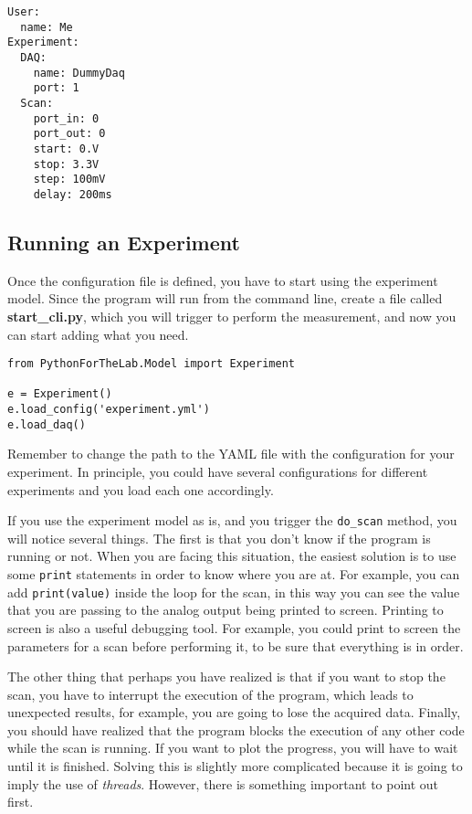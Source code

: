 \begin{verbatim}
User:
  name: Me
Experiment:
  DAQ:
    name: DummyDaq
    port: 1
  Scan:
    port_in: 0
    port_out: 0
    start: 0.V
    stop: 3.3V
    step: 100mV
    delay: 200ms
\end{verbatim}

\subsection{Running an Experiment}\label{running-anexperiment}
Once the configuration file is defined, you have to start using the
experiment model. Since the program will run from the command line,
create a file called \textbf{start\_cli.py}, which you will trigger to
perform the measurement, and now you can start adding what you need.

\begin{verbatim}
from PythonForTheLab.Model import Experiment

e = Experiment()
e.load_config('experiment.yml')
e.load_daq()
\end{verbatim}

Remember to change the path to the {YAML} file with the configuration
for your experiment. In principle, you could have several configurations
for different experiments and you load each one accordingly.


If you use the experiment model as is, and you trigger the
\texttt{do_scan} method, you will notice several things. The first is
that you don't know if the program is running or not. When you are
facing this situation, the easiest solution is to use some
\texttt{print} statements in order to know where you are at. For
example, you can add \texttt{print(value)} inside the loop for the scan,
in this way you can see the value that you are passing to the analog
output being printed to screen. Printing to screen is also a useful
debugging tool. For example, you could print to screen the parameters
for a scan before performing it, to be sure that everything is in order.

The other thing that perhaps you have realized is that if you want to
stop the scan, you have to interrupt the execution of the program, which
leads to unexpected results, for example, you are going to lose the
acquired data. Finally, you should have realized that the program blocks
the execution of any other code while the scan is running. If you want
to plot the progress, you will have to wait until it is finished.
Solving this is slightly more complicated because it is going to imply
the use of \emph{threads}. However, there is something important to
point out first.

